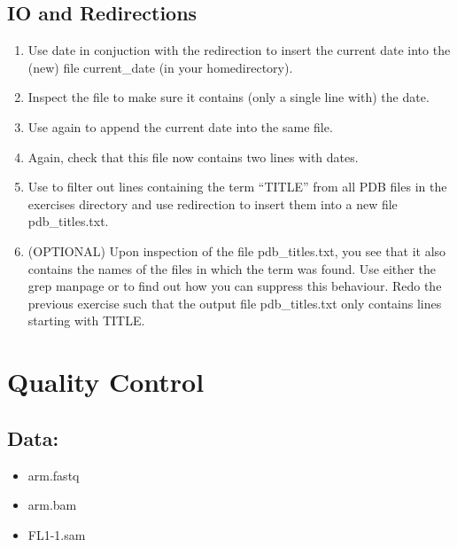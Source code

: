 \documentclass[letterpaper,10pt,english]{sphinxmanual}
\begin{document}
\section{IO and Redirections}
\label{exercises_beginner:io-and-redirections}\begin{enumerate}
\item {} 
Use date in conjuction with the redirection to insert the current date into the (new) file current\_date (in your homedirectory).

\item {} 
Inspect the file to make sure it contains (only a single line with) the date.

\item {} 
Use  again to append the current date into the same file.

\item {} 
Again, check that this file now contains two lines with dates.

\item {} 
Use  to filter out lines containing the term “TITLE” from all PDB files in the exercises directory and use redirection to insert them into a new file pdb\_titles.txt.

\item {} 
(OPTIONAL) Upon inspection of the file pdb\_titles.txt, you see that it also contains the names of the files in which the term was found.
Use either the grep manpage or  to find out how you can suppress this behaviour.
Redo the previous exercise such that the output file pdb\_titles.txt only contains lines starting with TITLE.

\end{enumerate}


\chapter{Quality Control}
\label{STEP1_QualityControl:quality-control}\label{STEP1_QualityControl::doc}

\section{Data:}
\label{STEP1_QualityControl:data}\begin{itemize}
\item {} 
arm.fastq

\item {} 
arm.bam

\item {} 
FL1-1.sam

\end{itemize}
\end{document}
